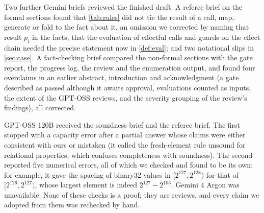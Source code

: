 Two further Gemini briefs reviewed the finished draft. A referee brief on the formal sections
found that \cref{tab:rules} did not tie the result of a call, map, generate or fold to the fact
about it, an omission we corrected by naming that result $p_i$ in the facts; that the
evaluation of effectful calls and guards on the effect chain needed the precise statement now in
\cref{def:eval}; and two notational slips in \cref{sec:case}. A fact-checking brief compared the
non-formal sections with the gate report, the progress log, the review and the enumeration
output, and found four overclaims in an earlier abstract, introduction and acknowledgment (a gate
described as passed although it awaits approval, evaluations counted as inputs, the extent of
the GPT-OSS reviews, and the severity grouping of the review's findings), all corrected.

GPT-OSS 120B received the soundness brief and the referee brief. The first stopped with a
capacity error after a partial answer whose claims were either consistent with ours or mistaken
(it called the fresh-element rule unsound for relational properties, which confuses completeness
with soundness). The second reported five numerical errors, all of which we checked and found
to be its own: for example, it gave the spacing of binary32 values in $[2^{127},2^{128})$ for
that of $[2^{126},2^{127})$, whose largest element is indeed $2^{127}-2^{103}$. Gemini 4 Argon was
unavailable. None of these checks is a proof; they are reviews, and every claim we adopted from
them was rechecked by hand.
